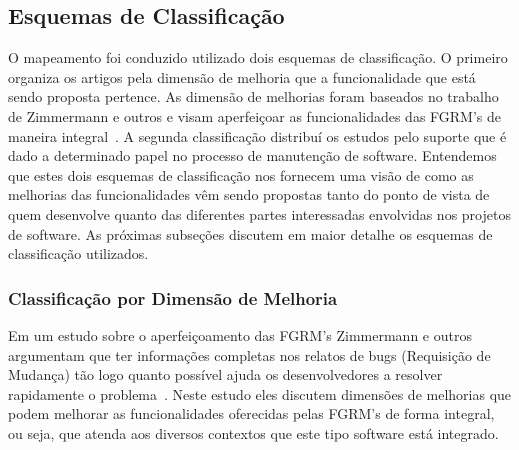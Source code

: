 \subsection{Esquemas de Classificação}
\label{subsec:map-esquemas-classificacao}

O mapeamento foi conduzido utilizado dois esquemas de classificação. O primeiro
organiza os artigos pela dimensão de melhoria que a funcionalidade que está
sendo proposta pertence. As dimensão de melhorias foram baseados no trabalho de
Zimmermann e outros e visam aperfeiçoar as funcionalidades das FGRM's de maneira
integral~\cite{zimmermann2009improving}. A segunda classificação distribuí os
estudos pelo suporte que é dado a determinado papel no processo de manutenção de
software. Entendemos que estes dois esquemas de classificação nos fornecem uma
visão de como as melhorias das funcionalidades vêm sendo propostas tanto do
ponto de vista de quem desenvolve quanto das diferentes partes interessadas
envolvidas nos projetos de software. As próximas subseções discutem em maior
detalhe os esquemas de classificação utilizados.

\subsubsection{Classificação por Dimensão de Melhoria}
\label{subsubsec:map-esquema-suporte-problema}


Em um estudo sobre o aperfeiçoamento das FGRM's Zimmermann e outros argumentam
que ter informações completas nos relatos de bugs (Requisição de Mudança) tão
logo quanto possível ajuda os desenvolvedores a resolver rapidamente o
problema~\cite{zimmermann2009improving}. Neste estudo eles discutem dimensões de
melhorias que podem melhorar as funcionalidades oferecidas pelas FGRM's de forma
integral, ou seja, que atenda aos diversos contextos que este tipo software está
integrado.

